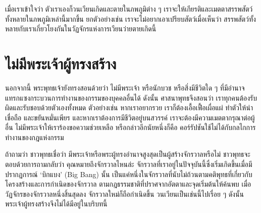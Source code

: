 \documentclass[12pt, openany]{book}
\begin{document}
เมื่อ{\wbr}เรา{\wbr}เข้าใจ{\wbr}ว่า ตัว{\wbr}เรา{\wbr}เอง{\wbr}ก็{\wbr}วนเวียน{\wbr}เกิด{\wbr}และ{\wbr}ตาย{\wbr}ใน{\wbr}ภพ{\wbr}ภูมิ{\wbr}ต่าง ๆ เรา{\wbr}จะ{\wbr}ให้{\wbr}เกียรติ{\wbr}และ{\wbr}เมตตา{\wbr}สรรพ{\wbr}สัตว์{\wbr}ทั้งหลาย{\wbr}ใน{\wbr}ภพ{\wbr}ภูมิ{\wbr}เหล่า{\wbr}นี้{\wbr}มาก{\wbr}ขึ้น  ยก{\wbr}ตัวอย่าง{\wbr}เช่น เรา{\wbr}จะ{\wbr}ไม่{\wbr}อยาก{\wbr}เอาเปรียบ{\wbr}สัตว์{\wbr}เมื่อ{\wbr}เห็น{\wbr}ว่า สรรพ{\wbr}สัตว์{\wbr}ทั้งหลาย{\wbr}กับ{\wbr}เรา{\wbr}เกี่ยวโยง{\wbr}กัน{\wbr}ใน{\wbr}วัฏจักร{\wbr}แห่ง{\wbr}การ{\wbr}เวียน{\wbr}ว่าย{\wbr}ตาย{\wbr}เกิด{\wbr}นี้ 

\section{ไม่{\wbr}มี{\wbr}พระเจ้า{\wbr}ผู้{\wbr}ทรง{\wbr}สร้าง}


นอกจาก{\wbr}นี้ พระพุทธเจ้า{\wbr}ยัง{\wbr}ทรง{\wbr}สอน{\wbr}ด้วย{\wbr}ว่า ไม่{\wbr}มี{\wbr}พระเจ้า หรือ{\wbr}นักบวช หรือ{\wbr}สิ่ง{\wbr}มี{\wbr}ชีวิต{\wbr}ใด ๆ ที่{\wbr}มี{\wbr}อำนาจ{\wbr}แทรกแซง{\wbr}กระบวนการ{\wbr}ทำงาน{\wbr}ของ{\wbr}กรรม{\wbr}ของ{\wbr}บุคคล{\wbr}อื่น{\wbr}ได้  ดังนั้น ศาสนา{\wbr}พุทธ{\wbr}จึง{\wbr}สอน{\wbr}ว่า เรา{\wbr}ทุก{\wbr}คน{\wbr}ต้อง{\wbr}รับผิด{\wbr}และ{\wbr}รับ{\wbr}ชอบ{\wbr}ด้วย{\wbr}ตัวเอง{\wbr}ทั้งหมด  ตัวอย่าง{\wbr}เช่น หาก{\wbr}เรา{\wbr}อยาก{\wbr}รวย เรา{\wbr}ก็{\wbr}ต้อง{\wbr}เอื้อเฟื้อ{\wbr}เผื่อแผ่ ทำ{\wbr}ตัว{\wbr}ให้{\wbr}น่า{\wbr}เชื่อถือ และ{\wbr}ขยัน{\wbr}หมั่น{\wbr}เพียร  และ{\wbr}หาก{\wbr}เรา{\wbr}ต้องการ{\wbr}มี{\wbr}ชีวิต{\wbr}อยู่{\wbr}บน{\wbr}สวรรค์ เรา{\wbr}จะ{\wbr}ต้อง{\wbr}มี{\wbr}ความ{\wbr}เมตตา{\wbr}กรุณา{\wbr}ต่อ{\wbr}ผู้{\wbr}อื่น  ไม่{\wbr}มี{\wbr}พระเจ้า{\wbr}ให้{\wbr}เรา{\wbr}ร้องขอ{\wbr}ความ{\wbr}ช่วยเหลือ หรือ{\wbr}กล่าว{\wbr}อีก{\wbr}นัย{\wbr}หนึ่ง{\wbr}ก็{\wbr}คือ คอร์รัปชัน{\wbr}ใช้{\wbr}ไม่{\wbr}ได้{\wbr}กับ{\wbr}กลไก{\wbr}การ{\wbr}ทำงาน{\wbr}ของ{\wbr}กฎ{\wbr}แห่ง{\wbr}กรรม{\wbr}

ถ้า{\wbr}ถาม{\wbr}ว่า ชาว{\wbr}พุทธ{\wbr}เชื่อ{\wbr}ว่า มี{\wbr}พระเจ้า{\wbr}หรือ{\wbr}พระ{\wbr}ผู้{\wbr}ทรง{\wbr}อำนาจ{\wbr}สูง{\wbr}สุด{\wbr}เป็น{\wbr}ผู้{\wbr}สร้าง{\wbr}จักรวาล{\wbr}หรือ{\wbr}ไม่  ชาว{\wbr}พุทธ{\wbr}จะ{\wbr}ตอบ{\wbr}ด้วย{\wbr}การ{\wbr}ถาม{\wbr}กลับ{\wbr}ว่า คุณ{\wbr}หมาย{\wbr}ถึง{\wbr}จักรวาล{\wbr}ไหน{\wbr}ล่ะ  จักรวาล{\wbr}ที่{\wbr}เรา{\wbr}อยู่{\wbr}ใน{\wbr}ปัจจุบัน{\wbr}นี้{\wbr}ซึ่ง{\wbr}เริ่ม{\wbr}เกิด{\wbr}ขึ้น{\wbr}เมื่อ{\wbr}มี{\wbr}ปรากฏการณ์ ‘บิ{\wbr}ก{\wbr}แบ{\wbr}ง’ (Big Bang) นั้น เป็น{\wbr}แค่{\wbr}หนึ่ง{\wbr}ใน{\wbr}จักรวาล{\wbr}ที่{\wbr}นับ{\wbr}ไม่{\wbr}ถ้วน{\wbr}ตาม{\wbr}คติ{\wbr}พุทธ{\wbr}ที่{\wbr}เกี่ยว{\wbr}กับ{\wbr}โครงสร้าง{\wbr}และ{\wbr}การ{\wbr}กำเนิด{\wbr}ของ{\wbr}จักรวาล  ตาม{\wbr}กฎ{\wbr}ธรรมชาติ{\wbr}ที่{\wbr}ปราศจาก{\wbr}อัตตา{\wbr}และ{\wbr}จุด{\wbr}เริ่มต้น{\wbr}ให้{\wbr}ค้น{\wbr}พบ เมื่อ{\wbr}วัฏจักร{\wbr}ของ{\wbr}จักรวาล{\wbr}หนึ่ง{\wbr}สิ้นสุด{\wbr}ลง จักรวาล{\wbr}ใหม่{\wbr}ก็{\wbr}ถือ{\wbr}กำเนิด{\wbr}ขึ้น วนเวียน{\wbr}เป็น{\wbr}เช่น{\wbr}นี้{\wbr}ไป{\wbr}เรื่อย ๆ  ดังนั้น พระเจ้า{\wbr}ผู้{\wbr}ทรง{\wbr}สร้าง{\wbr}จึง{\wbr}ไม่{\wbr}ได้{\wbr}มี{\wbr}อยู่{\wbr}ใน{\wbr}บริบท{\wbr}นี้{\wbr}
\end{document}

